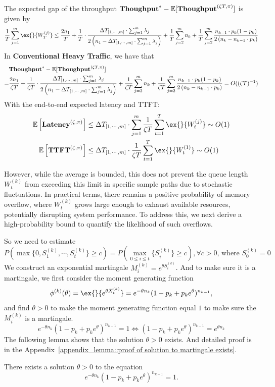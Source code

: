 The expected gap of the throughput $\textbf{Thoughput}^* - \mathbb{E}[\textbf{Thoughput}^{(\zeta T, \pi)}]$ is given by
$$\frac{1}{T}\sum_{j=1}^m \ex{}{W_T^{(j)}}\leq
\frac{2n_1}{T} +\frac{1}{T} \cdot\frac{\Delta T_{ [1,\cdots,m] }\cdot \sum_{j=1}^m \lambda_j}{2\left( n_1 - \Delta T_{ [1,\cdots,m] }\cdot \sum_{j=1}^m \lambda_j\right)} +\frac{1}{T}\sum_{j=2}^m n_k +\frac{1}{T}\sum_{j=2}^m\frac{n_{k-1}\cdot p_k(1-p_k)}{2\left(n_{k}-n_{k-1}\cdot p_k\right)}$$
In \textbf{Conventional Heavy Traffic}, we have that
\begin{align*}
&\textbf{Thoughput}^* - \mathbb{E}[\textbf{Thoughput}^{(\zeta T, \pi)}] \\
=& \frac{2n_1}{\zeta T} +\frac{1}{\zeta T} \cdot\frac{\Delta T_{ [1,\cdots,m] }\cdot \sum_{j=1}^m \lambda_j}{2\left( n_1 - \Delta T_{ [1,\cdots,m] }\cdot \sum_{j=1}^m \lambda_j\right)} +\frac{1}{\zeta T}\sum_{j=2}^m n_k +\frac{1}{\zeta T}\sum_{j=2}^m\frac{n_{k-1}\cdot p_k(1-p_k)}{2\left(n_{k}-n_{k-1}\cdot p_k\right)} = O((\zeta T)^{-1})
\end{align*}
With the end-to-end expected latency and TTFT:
\begin{align*}
\mathbb{E}\left[ \Latency^{(\zeta, \pi)} \right]&\leq \Delta T_{[1,\cdots,m]}\cdot \sum_{j=1}^m \frac{1}{\zeta T}\sum_{t=1}^T\ex{}{W_t^{(j)}} \sim O(1)\\
\mathbb{E}\left[ \TTFT^{(\zeta, \pi)} \right]&\leq \Delta T_{[1,\cdots,m]}\cdot \frac{1}{\zeta T}\sum_{t=1}^T\ex{}{W_t^{(1)}} \sim O(1)
\end{align*}


However, while the average is bounded, this does not prevent the queue length $W_t^{(k)}$ from exceeding this limit in specific sample paths due to stochastic fluctuations. In practical terms, there remains a positive probability of memory overflow, where $W_t^{(k)}$ grows large enough to exhaust available resources, potentially disrupting system performance. To address this, we next derive a high-probability bound to quantify the likelihood of such overflows.

So we need to estimate 
$$P\left( \max\{0,S_1^{(k)},\cdots,S_t^{(k)}\} \ge c\right)=P\left( \max_{0\leq i\leq t}\{S_i^{(k)}\} \ge c\right), \forall c>0 ,\,\text{where }S_0^{(k)}=0$$
We construct an exponential martingale $M_i^{(k)} = e^{\theta S_i^{(k)}}$. And to make sure it is a martingale, we first consider the moment generating function
$$\phi^{(k)}(\theta) = \ex{}{e^{\theta X^{(k)}_t}}= e^{-\theta n_{k}}(1-p_k+p_ke^{\theta})^{n_{k-1}},$$
and find $\theta>0$ to make the moment generating function equal $1$ to make sure the $M_i^{(k)}$ is a martingale.
$$ e^{-\theta n_{k}}(1-p_k+p_ke^{\theta})^{n_{k-1}} = 1 \iff (1-p_k+p_ke^{\theta})^{n_{k-1}} = e^{\theta n_{k}}$$
The following lemma shows that the solution $\theta>0$ exists. And detailed proof is in the Appendix~\ref{appendix_lemma::proof of solution to martingale exists}.
\begin{lemma}\label{lemma::solution to martingale exists}
There exists a solution \(\theta > 0\) to the equation
\[
e^{-\theta n_{k}} (1 - p_k + p_k e^{\theta})^{n_{k-1}} = 1.
\]
\end{lemma}


